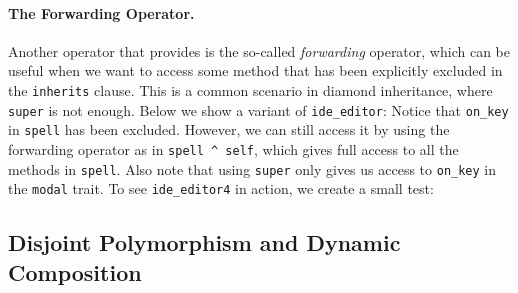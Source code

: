 

\paragraph{The Forwarding Operator.}
Another operator that \name provides is the so-called \emph{forwarding}
operator, which can be useful when we want to access some method that has been
explicitly excluded in the \lstinline{inherits} clause. This is a common scenario in
diamond inheritance, where \lstinline{super} is not enough. Below we show a
variant of \lstinline{ide_editor}:
Notice that \lstinline{on_key} in \lstinline{spell} has been
excluded. However, we can
still access it by using the forwarding operator as in \lstinline{spell ^ self},
which gives full access to all the methods in \lstinline{spell}. Also note that
using \lstinline{super} only gives us access to \lstinline{on_key} in the
\lstinline{modal} trait. To see \lstinline{ide_editor4} in action, we create a
small test:




\subsection{Disjoint Polymorphism and Dynamic Composition}
\label{sec:merge}

